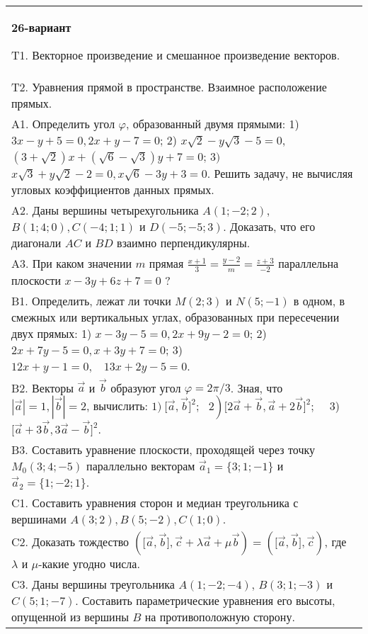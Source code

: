 \documentclass{article}
\begin{document}
\begin{tabular}{m{17cm}}
\textbf{26-вариант}
\newline

T1. 
Векторное произведение и смешанное произведение векторов.
 \\
T2. 
Уравнения прямой в пространстве. Взаимное расположение прямых.
 \\
A1. 
Определить угол \(\varphi\), образованный двумя прямыми: 1) \(3x - y + 5 = 0,2x + y - 7 = 0\); 2) \(x\sqrt{2} - y\sqrt{3} - 5 = 0\), \((3 + \sqrt{2})x + (\sqrt{6} - \sqrt{3})y + 7 = 0\); \(3)\) \(x\sqrt{3} + y\sqrt{2} - 2 = 0,x\sqrt{6} - 3y + 3 = 0\). Решить задачу, не вычисляя угловых коэффициентов данных прямых.
 \\
A2. 
Даны вершины четырехугольника \(A(1; - 2;2)\), \(B(1;4;0),C( - 4;1;1)\) и \(D( - 5; - 5;3)\). Доказать, что его диагонали \(AC\) и \(BD\) взаимно перпендикулярны.
 \\
A3. 
При каком значении \(m\) прямая \(\frac{x + 1}{3} = \frac{y - 2}{m} = \frac{z + 3}{- 2}\) параллельна плоскости \(x - 3y + 6z + 7 = 0\) ?
 \\
B1. 
Определить, лежат ли точки \(M(2;3)\) и \(N(5; - 1)\) в одном, в смежных или вертикальных углах, образованных при пересечении двух прямых: 1) \(x - 3y - 5 = 0,2x + 9y - 2 = 0\); 2) \(2x + 7y - 5 = 0,x + 3y + 7 = 0\); 3) \(12x + y - 1 = 0,\ \ \ \ 13x + 2y - 5 = 0\).
 \\
B2. 
Векторы \(\overrightarrow{a}\) и \(\overrightarrow{b}\) образуют угол \(\varphi = 2\pi/3\). Зная, что \(|\overrightarrow{a}| = 1,|\overrightarrow{b}| = 2\), вычислить: \(1)\left. \ \lbrack\overrightarrow{a},\overrightarrow{b}\rbrack^{2};\ \ \ 2 \right)\lbrack 2\overrightarrow{a} + \overrightarrow{b},\overrightarrow{a} + 2\overrightarrow{b}\rbrack^{2};\ \ \ \ \) 3) \(\lbrack\overrightarrow{a} + 3\overrightarrow{b},3\overrightarrow{a} - \overrightarrow{b}\rbrack^{2}\).
 \\
B3. Составить уравнение плоскости, проходящей через точку \(M_{0}(3;4; - 5)\) параллельно векторам \({\overrightarrow{a}}_{1} = \{ 3;1; - 1\}\) и \({\overrightarrow{a}}_{2} = \{ 1; - 2;1\}\).
 \\
C1. 
Составить уравнения сторон и медиан треугольника с вершинами \(A(3;2),B(5; - 2),C(1;0)\).
 \\
C2. 
Доказать тождество \((\lbrack\overrightarrow{a},\overrightarrow{b}\rbrack,\overrightarrow{c} + \lambda\overrightarrow{a} + \mu\overrightarrow{b}) = (\lbrack\overrightarrow{a},\overrightarrow{b}\rbrack,\overrightarrow{c})\), где \(\lambda\) и \(\mu\)-какие угодно числа.
 \\
C3. 
Даны вершины треугольника \(A(1; - 2; - 4)\), \(B(3;1; - 3)\) и \(C(5;1; - 7)\). Составить параметрические уравнения его высоты, опущенной из вершины \(B\) на противоположную сторону.
 \\

\end{tabular}
\vspace{1cm}
\end{document}
